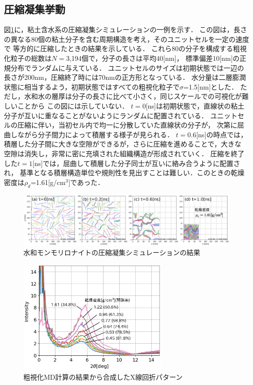 ﻿\documentclass[11pt,a4j]{jarticle}
\begin{document}
\subsection{圧縮凝集挙動}
図\ref{fig:fig2}に，粘土含水系の圧縮凝集シミュレーションの一例を示す．
この図は，長さの異なる80個の粘土分子を含む周期構造を考え，そのユニットセルを一定の速度で
等方的に圧縮したときの結果を示している．
これら80の分子を構成する粗視化粒子の総数は$N=$3,194個で，分子の長さは平均40[nm]，
標準偏差10[nm]の正規分布でランダムに与えている．
ユニットセルのサイズは初期状態では一辺の長さが200nm，圧縮終了時には70nmの正方形となっている．
水分量は二層膨潤状態に相当するよう，初期状態ではすべての粗視化粒子で$\sigma$=1.5[nm]とした．
ただし，水和水の層厚は分子の長さに比べて小さく，同じスケールでの可視化が難しいことから
この図には示していない．
$t=0$[ns]は初期状態で，直線状の粘土分子が互いに重なることがないようにランダムに配置されている．
ユニットセルの圧縮に伴い，当初セル内で均一に分散していた直線状の分子が，
次第に屈曲しながら分子間力によって積層する様子が見られる．
$t=$0.6[ns]の時点では，積層した分子間に大きな空隙ができるが，さらに圧縮を進めることで，大きな
空隙は消失し，非常に密に充填された組織構造が形成されていく．
圧縮を終了した$t=1$[ns]では，屈曲して積層した分子同士が互いに絡み合うように配置され，
基準となる積層構造単位や規則性を見出すことは難しい．このときの乾燥密度は$\rho_d$=1.61[g/cm$^3$]であった．
\begin{figure}[t]
	\begin{center}
	\includegraphics[width=1.0\linewidth]{Figs/revs.eps} 
	\end{center}
	\caption{水和モンモリロナイトの圧縮凝集シミュレーションの結果} 
	\label{fig:fig2}
\end{figure}
\begin{figure}
	\centering
	\includegraphics[keepaspectratio,width=75mm]{Figs/xrd.eps}
	\vspace{-5mm}
	\caption{粗視化MD計算の結果から合成したX線回折パターン}
	\label{fig:fig3}
\end{figure}
\end{document}
